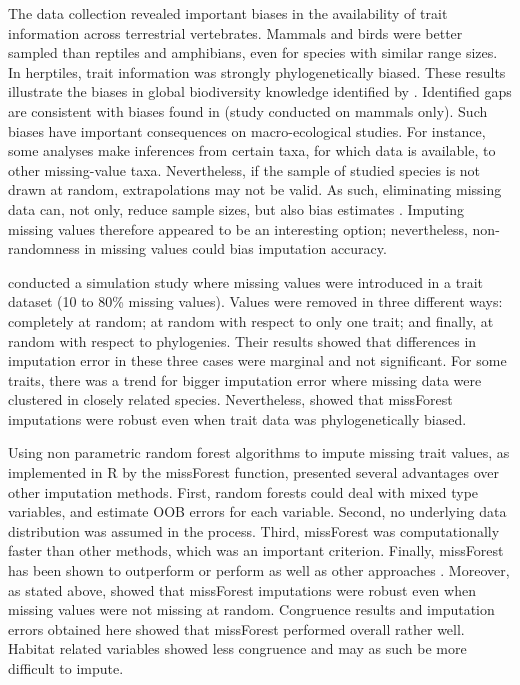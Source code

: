 The data collection revealed important biases in the availability of trait information across terrestrial vertebrates. Mammals and birds were better sampled than reptiles and amphibians, even for species with similar range sizes. In herptiles, trait information was strongly phylogenetically biased. These results illustrate the biases in global biodiversity knowledge identified by \citet{Hortal2014}. Identified gaps are consistent with biases found in \citet{Gonzalez-Suarez2012} (study conducted on mammals only). Such biases have important consequences on macro-ecological studies. For instance, some analyses make inferences from certain taxa, for which data is available, to other missing-value taxa. Nevertheless, if the sample of studied species is not drawn at random, extrapolations may not be valid. As such, eliminating missing data can, not only, reduce sample sizes, but also bias estimates \citep{Nakagawa2008}. Imputing missing values therefore appeared to be an interesting option; nevertheless, non-randomness in missing values could bias imputation accuracy.

\citet{Penone2014} conducted a simulation study where missing values were introduced in a trait dataset (10 to 80\% missing values). Values were removed in three different ways: completely at random; at random with respect to only one trait; and finally, at random with respect to phylogenies. Their results showed that differences in imputation error in these three cases were marginal and not significant. For some traits, there was a trend for bigger imputation error where missing data were clustered in closely related species.  Nevertheless, \citet{Penone2014} showed that missForest imputations were robust even when trait data was phylogenetically biased.  

Using non parametric random forest algorithms to impute missing trait values, as implemented in R by the missForest function, presented several advantages over other imputation methods. First, random forests could deal with mixed type variables, and estimate OOB errors for each variable. Second, no underlying data distribution was assumed in the process. Third, missForest was computationally faster than other methods, which was an important criterion. Finally, missForest has been shown to outperform or perform as well as other approaches \citep{Stekhoven2012, Penone2014}. Moreover, as stated above, \citet{Penone2014} showed that missForest imputations were robust even when  missing values were not missing at random. Congruence results and imputation errors obtained here showed that missForest performed overall rather well. Habitat related variables showed less congruence and may as such be more difficult to impute.

